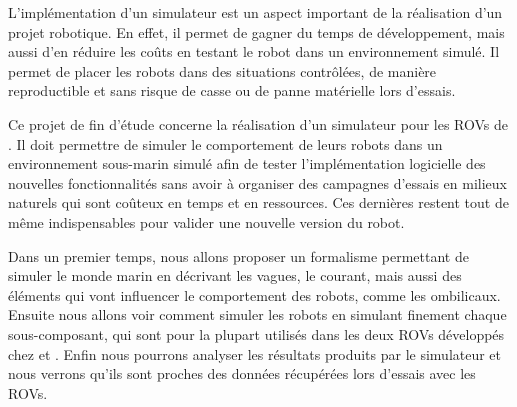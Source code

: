 L'implémentation d'un simulateur est un aspect important de la réalisation d'un projet robotique. En effet, il permet de gagner du temps de développement, mais aussi d'en réduire les coûts en testant le robot dans un environnement simulé. Il permet de placer les robots dans des situations contrôlées, de manière reproductible et sans risque de casse ou de panne matérielle lors d'essais.

Ce projet de fin d'étude concerne la réalisation d'un simulateur pour les \gls{ROV}s de \forssea{}. Il doit permettre de simuler le comportement de leurs robots dans un environnement sous-marin simulé afin de tester l'implémentation logicielle des nouvelles fonctionnalités sans avoir à organiser des campagnes d'essais en milieux naturels qui sont coûteux en temps et en ressources. Ces dernières restent tout de même indispensables pour valider une nouvelle version du robot.

Dans un premier temps, nous allons proposer un formalisme permettant de simuler le monde marin en décrivant les vagues, le courant, mais aussi des éléments qui vont influencer le comportement des robots, comme les ombilicaux. Ensuite nous allons voir comment simuler les robots en simulant finement chaque sous-composant, qui sont pour la plupart utilisés dans les deux \gls{ROV}s développés chez \forssea{} \argos{} et \atoll{}. Enfin nous pourrons analyser les résultats produits  par le simulateur et nous verrons qu'ils sont proches des données récupérées lors d'essais avec les \gls{ROV}s.